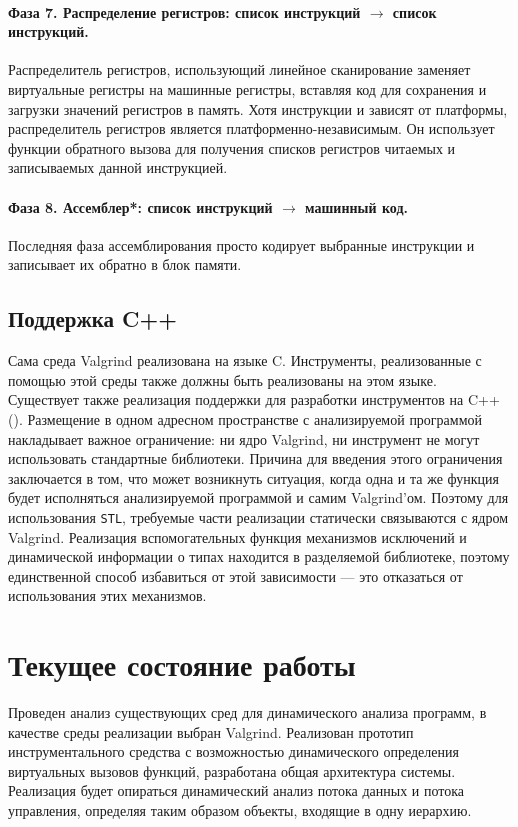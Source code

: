 \documentclass[a4paper,12pt,russian]{article}
\begin{document}
\paragraph{Фаза 7. Распределение регистров: список инструкций $\to$ список инструкций.}
Распределитель регистров, использующий линейное сканирование заменяет виртуальные регистры на машинные регистры, вставляя код для сохранения и загрузки значений регистров в память.
Хотя инструкции и зависят от платформы, распределитель регистров является платформенно-независимым.
Он использует функции обратного вызова для получения списков регистров читаемых и записываемых данной инструкцией.

\paragraph{Фаза 8. Ассемблер*: список инструкций $\to$ машинный код.}
Последняя фаза ассемблирования просто кодирует выбранные инструкции и записывает их обратно в блок памяти.

\subsection{Поддержка C++}
Сама среда Valgrind реализована на языке C. Инструменты, реализованные с помощью этой среды также должны быть реализованы на этом языке.
Существует также реализация поддержки для разработки инструментов на C++ (\cite{cppvg}).
Размещение в одном адресном пространстве с анализируемой программой накладывает важное ограничение: ни ядро Valgrind, ни инструмент не могут использовать стандартные библиотеки.
Причина для введения этого ограничения заключается в том, что может возникнуть ситуация, когда одна и та же функция будет исполняться анализируемой программой и самим Valgrind'ом.
Поэтому для использования \texttt{STL}, требуемые части реализации статически связываются с ядром Valgrind.
Реализация вспомогательных функция механизмов исключений и динамической информации о типах находится в разделяемой библиотеке, поэтому единственной способ избавиться от этой зависимости --- это отказаться от использования этих механизмов.

\newpage
\section{Текущее состояние работы}
Проведен анализ существующих сред для динамического анализа программ, в качестве среды реализации выбран Valgrind.
Реализован прототип инструментального средства с возможностью динамического определения виртуальных вызовов функций, разработана общая архитектура системы.
Реализация будет опираться динамический анализ потока данных и потока управления, определяя таким образом объекты, входящие в одну иерархию.
\end{document}
